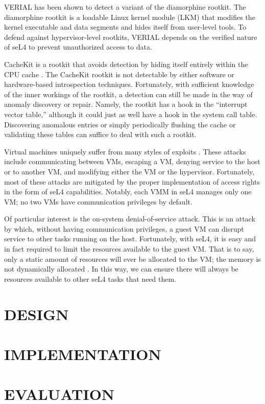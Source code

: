 \documentclass[a4paper,twoside]{article}
\begin{document}
VERIAL has been shown to detect a variant of the diamorphine rootkit. The diamorphine rootkit is a loadable Linux kernel module (LKM) that modifies the kernel executable and data segments and hides itself from user-level tools. To defend against hypervisor-level rootkits, VERIAL depends on the verified nature of seL4 to prevent unauthorized access to data.

CacheKit is a rootkit that avoids detection by hiding itself entirely within the CPU cache \cite{CacheKit}. The CacheKit rootkit is not detectable by either software or hardware-based introspection techniques. Fortunately, with sufficient knowledge of the inner workings of the rootkit, a detection can still be made in the way of anomaly discovery or repair. Namely, the rootkit has a hook in the ``interrupt vector table,'' although it could just as well have a hook in the system call table. Discovering anomalous entries or simply periodically flushing the cache or validating these tables can suffice to deal with such a rootkit.

Virtual machines uniquely suffer from many styles of exploits \cite{VMSecurity}. These attacks include communicating between VMs, escaping a VM, denying service to the host or to another VM, and modifying either the VM or the hypervisor. Fortunately, most of these attacks are mitigated by the proper implementation of access rights in the form of seL4 capabilities. Notably, each VMM in seL4 manages only one VM; no two VMs have communication privileges by default.

Of particular interest is the on-system denial-of-service attack. This is an attack by which, without having communication privileges, a guest VM can disrupt service to other tasks running on the host. Fortunately, with seL4, it is easy and in fact required to limit the resources available to the guest VM. That is to say, only a static amount of resources will ever be allocated to the VM; the memory is not dynamically allocated \cite{seL4Docs}. In this way, we can ensure there will always be resources available to other seL4 tasks that need them.

\section{\uppercase{Design}}
\section{\uppercase{Implementation}}
\section{\uppercase{Evaluation}}
\end{document}
